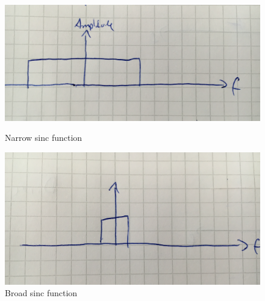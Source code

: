\documentclass[12pt]{article}
\begin{document}
\begin{figure}[!htbp]
  \centering
  \begin{minipage}[b]{0.45\textwidth}
    \includegraphics[width=\textwidth]{images/sinc_narrow}
    \caption{Narrow sinc function}
  \end{minipage}
  \hfill
  \begin{minipage}[b]{0.45\textwidth}
    \includegraphics[width=\textwidth]{images/sinc_broad}
    \caption{Broad sinc function}
  \end{minipage}
\end{figure}
\end{document}

